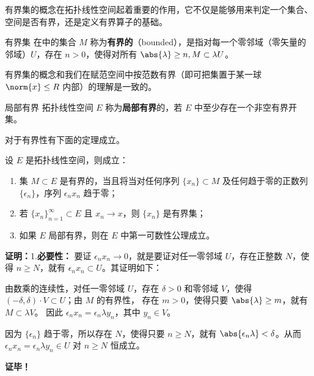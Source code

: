 
有界集的概念在拓扑线性空间起着重要的作用，它不仅是能够用来判定一个集合、空间是否有界，还是定义有界算子的基础。

\begin{definition}{有界集}
在中的集合 $M$ 称为\textbf{有界的}（bounded），是指对每一个零邻域（零矢量的邻域）$U$，存在 $n>0$，使得对所有 $\abs{\lambda}\geq n,M\subset \lambda U$。 
\end{definition}
有界集的概念和我们在赋范空间中按范数有界（即可把集置于某一球 $\norm{x}\leq R$ 内部）的理解是一致的。

\begin{definition}{局部有界}
拓扑线性空间 $E$ 称为\textbf{局部有界}的，若 $E$ 中至少存在一个非空有界开集。
\end{definition}

对于有界性有下面的定理成立。
\begin{theorem}{}
设 $E$ 是拓扑线性空间，则成立：
\begin{enumerate}
\item 集 $M\subset E$ 是有界的，当且将当对任何序列 $\{x_n\}\subset M$ 及任何趋于零的正数列 $\{\epsilon_n\}$，序列 $\epsilon_n x_n$ 趋于零；
\item 若 $\{x_n\}_{n=1}^\infty\subset E$ 且 $x_n\rightarrow x$，则 $\{x_n\}$ 是有界集；
\item 如果 $E$ 局部有界，则在 $E$ 中第一可数性公理成立。 
\end{enumerate}

\end{theorem}

\textbf{证明：}1.\textbf{必要性：} 要证 $\epsilon_n x_n\rightarrow0$，就是要证对任一零邻域 $U$，存在正整数 $N$，使得 $n\geq N$，就有 $\epsilon_n x_n\subset U$。其证明如下：

由数乘的连续性，对任一零邻域 $U$，存在 $\delta>0$ 和零邻域 $V$，使得 $(-\delta,\delta)\cdot V\subset U$；由 $M$ 的有界性， 存在 $m>0$，使得只要 $\abs{\lambda}\geq m$，就有 $M\subset\lambda V$。 因此 $\epsilon_nx_n=\epsilon_n \lambda y_n$，其中 $y_n\in V$。

因为 $\{\epsilon_n\}$ 趋于零，所以存在 $N$，使得只要 $n\geq N$，就有 $\abs{\epsilon_n\lambda}<\delta$。从而 $\epsilon_nx_n=\epsilon_n \lambda y_n\in U$ 对 $n\geq N$ 恒成立。




\textbf{证毕！}











